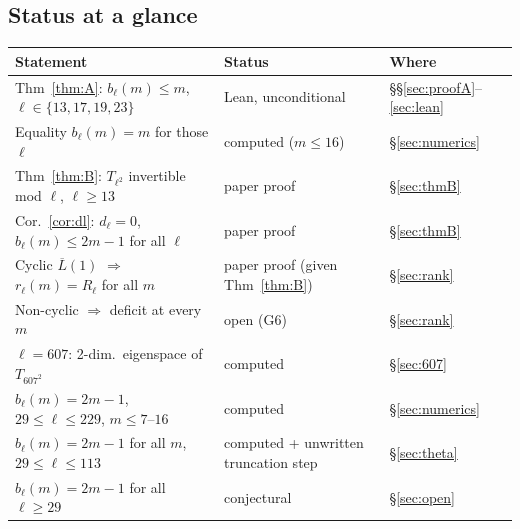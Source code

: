 \documentclass[11pt]{amsart}
\newcommand{\Lb}{\overline{L}}
\theoremstyle{plain}
\theoremstyle{definition}
\numberwithin{equation}{section}
\begin{document}
\subsection{Status at a glance}
\begin{center}
\small
\begin{tabular}{@{}p{}p{}p{}@{}}
\toprule
Statement & Status & Where\\
\midrule
Thm~\ref{thm:A}: $b_\ell(m)\le m$, $\ell\in\{13,17,19,23\}$ & Lean, unconditional & \S\S\ref{sec:proofA}--\ref{sec:lean}\\
Equality $b_\ell(m)=m$ for those $\ell$ & computed ($m\le16$) & \S\ref{sec:numerics}\\
Thm~\ref{thm:B}: $T_{\ell^2}$ invertible mod $\ell$, $\ell\ge13$ & paper proof & \S\ref{sec:thmB}\\
Cor.~\ref{cor:dl}: $d_\ell=0$, $b_\ell(m)\le2m-1$ for all $\ell$ & paper proof & \S\ref{sec:thmB}\\
Cyclic $\Lb(1)$ $\Rightarrow$ $r_\ell(m)=R_\ell$ for all $m$ & paper proof (given Thm~\ref{thm:B}) & \S\ref{sec:rank}\\
Non-cyclic $\Rightarrow$ deficit at every $m$ & open (G6) & \S\ref{sec:rank}\\
$\ell=607$: 2-dim.\ eigenspace of $T_{607^2}$ & computed & \S\ref{sec:607}\\
$b_\ell(m)=2m-1$, $29\le\ell\le229$, $m\le 7$--$16$ & computed & \S\ref{sec:numerics}\\
$b_\ell(m)=2m-1$ for all $m$, $29\le\ell\le113$ & computed + unwritten truncation step & \S\ref{sec:theta}\\
$b_\ell(m)=2m-1$ for all $\ell\ge 29$ & conjectural & \S\ref{sec:open}\\
\bottomrule
\end{tabular}
\end{center}
\end{document}
